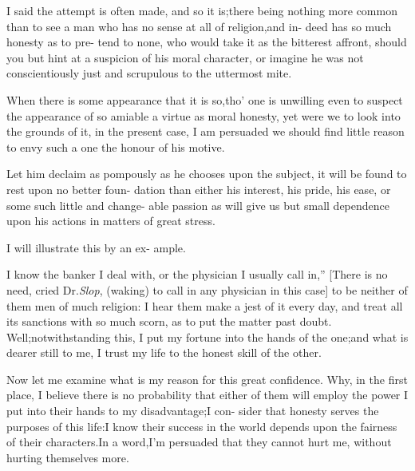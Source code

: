 \documentclass{article}
\begin{document}
\lqq I said the attempt is often made,\break
\lqq and so it is;\tsh there being nothing
\lqq more common than to see a man who\break
\lqq has no sense at all of religion,\tsk and in-\break
\lqq deed has so much honesty as to pre-\break
\lqq tend to none, who would take it as the\break
\lqq bitterest affront, should you but hint at\break
\lqq a suspicion of his moral character,\tsh\break
\lqq or imagine he was not conscientiously\break
\lqq just and scrupulous to the uttermost\break
\lqq mite.

\lqq When there is some appearance that\break
\lqq it is so,\tsk tho’ one is unwilling even to\break
\lqq suspect the appearance of so amiable a\break
\lqq virtue as moral honesty, yet were we\break
\lqq to look into the grounds of it, in the\break
\lqq present case, I am persuaded we should\break
\lqq find little reason to envy such a one\break
\lqq the honour of his motive.

\lqq Let him declaim as pompously as\break
\lqq he chooses upon the subject, it will
\lqq be found to rest upon no better foun-\break
\lqq dation than either his interest, his pride,\break
\lqq his ease, or some such little and change-\break
\lqq able passion as will give us but small\break
\lqq dependence upon his actions in matters\break
\lqq of great stress.

\lqq I will illustrate this by an ex-\break
\lqq ample.

\lqq I know the banker I deal with, or\break
\lqq the physician I usually call in,” [There\break
is no need, cried Dr.\@ \textit{Slop}, (waking) to call\break
in any physician in this case] \lqq to be\break
\lqq neither of them men of much religion:\break
\lqq I hear them make a jest of it every\break
\lqq day, and treat all its sanctions with so\break
\lqq much scorn, as to put the matter past\break
\lqq doubt.  Well;\tsk notwithstanding this,\break
\lqq I put my fortune into the hands of the\break
\lqq one;\tsk and what is dearer still to me,
\lqq I trust my life to the honest skill of\break
\lqq the other.

\lqq Now let me examine what is my\break
\lqq reason for this great confidence.\tsh\break
\lqq Why, in the first place, I believe there\break
\lqq is no probability that either of them\break
\lqq will employ the power I put into their\break
\lqq hands to my disadvantage;\tsk I con-\break
\lqq sider that honesty serves the purposes\break
\lqq of this life:\tsk I know their success in\break
\lqq the world depends upon the fairness of\break
\lqq their characters.\tsk In a word,\tsk I’m\break
\lqq persuaded that they cannot hurt me,\break
\lqq without hurting themselves more.
\end{document}
